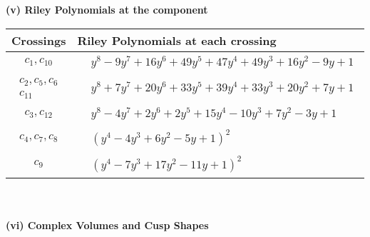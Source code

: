 \documentclass[1p]{elsarticle_modified}
\theoremstyle{definition}
\begin{document}
\newpage\renewcommand{\arraystretch}{1}
\flushleft \textbf{(v) Riley Polynomials at the component}\newline \\
\begin{tabular}{m{50pt}|m{274pt}}
Crossings & \hspace{64pt}Riley Polynomials at each crossing \\
\hline $$\begin{aligned}c_{1},c_{10}\end{aligned}$$&$\begin{aligned}
&y^8-9 y^7+16 y^6+49 y^5+47 y^4+49 y^3+16 y^2-9 y+1
\end{aligned}$\\
\hline $$\begin{aligned}c_{2},c_{5},c_{6}\\c_{11}\end{aligned}$$&$\begin{aligned}
&y^8+7 y^7+20 y^6+33 y^5+39 y^4+33 y^3+20 y^2+7 y+1
\end{aligned}$\\
\hline $$\begin{aligned}c_{3},c_{12}\end{aligned}$$&$\begin{aligned}
&y^8-4 y^7+2 y^6+2 y^5+15 y^4-10 y^3+7 y^2-3 y+1
\end{aligned}$\\
\hline $$\begin{aligned}c_{4},c_{7},c_{8}\end{aligned}$$&$\begin{aligned}
&(y^4-4 y^3+6 y^2-5 y+1)^2
\end{aligned}$\\
\hline $$\begin{aligned}c_{9}\end{aligned}$$&$\begin{aligned}
&(y^4-7 y^3+17 y^2-11 y+1)^2
\end{aligned}$\\
\hline
\end{tabular}\\~\\
\newpage\flushleft \textbf{(vi) Complex Volumes and Cusp Shapes}
\end{document}
